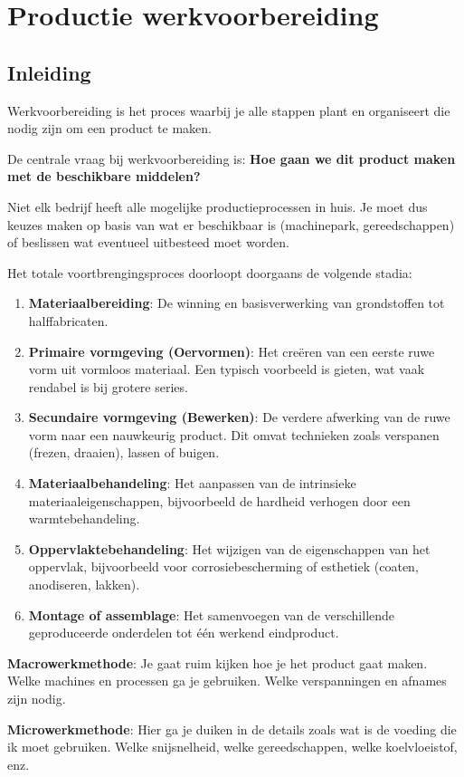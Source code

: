 \documentclass[a4paper,12pt,twoside]{report}
\begin{document}
\chapter{Productie werkvoorbereiding}
\section{Inleiding}
Werkvoorbereiding is het proces waarbij je alle stappen plant en organiseert die nodig zijn om een product te maken.

De centrale vraag bij werkvoorbereiding is: \textbf{Hoe gaan we dit product maken met de beschikbare middelen?}

Niet elk bedrijf heeft alle mogelijke productieprocessen in huis. Je moet dus keuzes maken op basis van wat er beschikbaar is (machinepark, gereedschappen) of beslissen wat eventueel uitbesteed moet worden.

Het totale voortbrengingsproces doorloopt doorgaans de volgende stadia:
\begin{enumerate}
	\item \textbf{Materiaalbereiding}: De winning en basisverwerking van grondstoffen tot halffabricaten.
	\item \textbf{Primaire vormgeving (Oervormen)}: Het creëren van een eerste ruwe vorm uit vormloos materiaal. Een typisch voorbeeld is gieten, wat vaak rendabel is bij grotere series.
	\item \textbf{Secundaire vormgeving (Bewerken)}: De verdere afwerking van de ruwe vorm naar een nauwkeurig product. Dit omvat technieken zoals verspanen (frezen, draaien), lassen of buigen.
	\item \textbf{Materiaalbehandeling}: Het aanpassen van de intrinsieke materiaaleigenschappen, bijvoorbeeld de hardheid verhogen door een warmtebehandeling.
	\item \textbf{Oppervlaktebehandeling}: Het wijzigen van de eigenschappen van het oppervlak, bijvoorbeeld voor corrosiebescherming of esthetiek (coaten, anodiseren, lakken).
	\item \textbf{Montage of assemblage}: Het samenvoegen van de verschillende geproduceerde onderdelen tot één werkend eindproduct.
\end{enumerate}

\textbf{Macrowerkmethode}: Je gaat ruim kijken hoe je het product gaat maken. Welke machines en processen ga je gebruiken.
Welke verspanningen en afnames zijn nodig.

\textbf{Microwerkmethode}: Hier ga je duiken in de details zoals wat is de voeding die ik moet gebruiken. Welke snijsnelheid, welke gereedschappen, welke koelvloeistof, enz.
\end{document}

